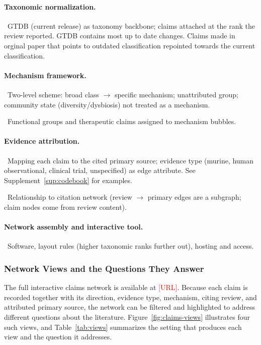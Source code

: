 \documentclass[11pt,a4paper]{article}
\newcommand{\todoitem}[1]{\par\noindent\textcolor{blue!70!black}{\textbullet~#1}}
\newcommand{\ph}[1]{\textcolor{red}{[#1]}}  %
\begin{document}
\paragraph{Taxonomic normalization.}
\todoitem{GTDB (current release) as taxonomy backbone; claims attached at the rank the review reported. GTDB contains most up to date changes. Claims made in orginal paper that points to outdated classification repointed towards the current classification. }

\paragraph{Mechanism framework.}
\todoitem{Two-level scheme: broad class $\to$ specific mechanism; unattributed group; community state (diversity/dysbiosis) not treated as a mechanism.}
\todoitem{Functional groups and therapeutic claims assigned to mechanism bubbles.}

\paragraph{Evidence attribution.}
\todoitem{Mapping each claim to the cited primary source; evidence type (murine, human observational, clinical trial, unspecified) as edge attribute. See Supplement~\ref{sup:codebook} for examples.}
\todoitem{Relationship to citation network (review $\to$ primary edges are a subgraph; claim nodes come from review content).}

\paragraph{Network assembly and interactive tool.}
\todoitem{Software, layout rules (higher taxonomic ranks further out), hosting and access.}

\subsubsection{Network Views and the Questions They Answer}
\label{sec:claims-views}

The full interactive claims network is available at \ph{URL}. Because each claim is recorded together with its direction, evidence type, mechanism, citing review, and attributed primary source, the network can be filtered and highlighted to address different questions about the literature. Figure~\ref{fig:claims-views} illustrates four such views, and Table~\ref{tab:views} summarizes the setting that produces each view and the question it addresses.
\end{document}
